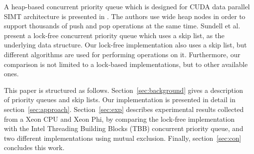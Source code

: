 A heap-based concurrent priority queue which is designed for CUDA data parallel SIMT architecture is presented in \cite{DBLP:conf/hipc/HeAP12}.
The authors use wide heap nodes in order to support thousands of push and pop operations at the same time.
Sundell et al.~\cite{Sundell:2005:FLC:1073765.1073770} present a lock-free concurrent priority queue which uses a skip list, as the underlying data structure.
Our lock-free implementation also uses a skip list, but different algorithms are used for performing operations on it. Furthermore, our comparison is not limited to a lock-based implementations, but to other available ones.

This paper is structured as follows.
Section~\ref{sec:background} gives a description of priority queues and skip lists.
Our implementation is presented in detail in section~\ref{sec:approach}. Section~\ref{sec:exp} describes experimental results collected from a Xeon CPU and Xeon Phi, by comparing the lock-free implementation with the Intel Threading Building Blocks (TBB) concurrent priority queue, and two different implementations using mutual exclusion. Finally, section~\ref{sec:con} concludes this work.

